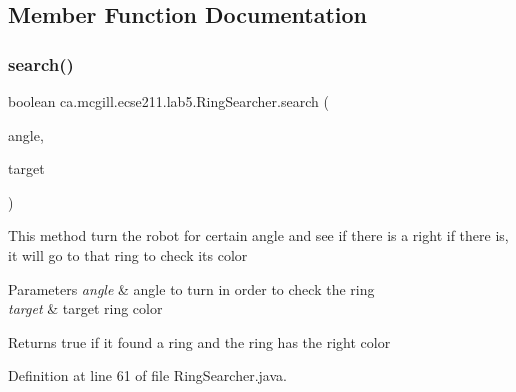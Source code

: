 \subsection{Member Function Documentation}
\mbox{\label{classca_1_1mcgill_1_1ecse211_1_1lab5_1_1_ring_searcher_a88a4c77f3c76d74edc8bfd0229f0902f}} 
\subsubsection{\texorpdfstring{search()}{search()}}
{\footnotesize\ttfamily boolean ca.\+mcgill.\+ecse211.\+lab5.\+Ring\+Searcher.\+search (\begin{DoxyParamCaption}\item[{int}]{angle,  }\item[{Color\+Calibrator.\+Color}]{target }\end{DoxyParamCaption})}

This method turn the robot for certain angle and see if there is a right if there is, it will go to that ring to check its color


\begin{DoxyParams}{Parameters}
{\em angle} & angle to turn in order to check the ring \\
\hline
{\em target} & target ring color \\
\hline
\end{DoxyParams}
\begin{DoxyReturn}{Returns}
true if it found a ring and the ring has the right color 
\end{DoxyReturn}


Definition at line 61 of file Ring\+Searcher.\+java.

